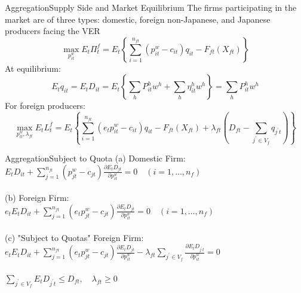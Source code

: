 \documentclass{beamer}
\begin{document}
\begin{frame}{Aggregation}{Supply Side and Market Equilibrium}
The firms participating in the market are of three types: domestic, foreign non-Japanese, and Japanese producers facing the VER
$$\max _{p_{i t}^{w}} E_{t} \Pi_{t}^{f}=E_{t}\left\{\sum_{i=1}^{n_{f t}}\left(p_{i t}^{w}-c_{i t}\right) q_{i t}-F_{f t}\left(X_{f t}\right)\right\}$$
At equilibrium:
$$E_{t} q_{i t}=E_{t} D_{i t}=E_{t}\left\{\sum_{h} P_{i t}^{h} w^{h}+\sum_{h} \eta_{i t}^{h} w^{h}\right\}=\sum_{h} P_{i t}^{h} w^{h}$$
For foreign producers:
$$\max _{p_{t t}^{w}, \lambda_{f t}} E_{t} L_{t}^{f}=E_{t}\left\{\sum_{i=1}^{n_{f t}}\left(e_{t} p_{i t}^{w}-c_{i t}\right) q_{i t}-F_{f t}\left(X_{f t}\right)+\lambda_{f t}\left(D_{f t}-\sum_{j^{\prime} \in V_{f}} q_{j^{\prime} t}\right)\right\}$$
\end{frame}
\begin{frame}{Aggregation}{Subject to Quota}
	(a) Domestic Firm: \\
	$E_{t} D_{i t}+\sum_{j=1}^{n_{f t}}\left(p_{j t}^{w}-c_{j t}\right) \frac{\partial E_{t} D_{j t}}{\partial p_{i t}^{w}}=0 \quad\left(i=1, \ldots, n_{f}\right)$ \\~\\
	(b) Foreign Firm: \\
	$e_{t} E_{t} D_{i t}+\sum_{j=1}^{n_{f t}}\left(e_{t} p_{j t}^{w}-c_{j t}\right) \frac{\partial E_{t} D_{j t}}{\partial p_{i t}^{w}}=0 \quad\left(i=1, \ldots, n_{f}\right)$ \\~\\
	(c) "Subject to Quotas" Foreign Firm: \\
	$e_{t} E_{t} D_{i t}+\sum_{j=1}^{n_{f t}}\left(e_{t} p_{j t}^{w}-c_{j t}\right) \frac{\partial E_{t} D_{j t}}{\partial p_{i t}^{w}}-\lambda_{f t} \sum_{j^{\prime} \in V_{f}} \frac{\partial E_{t} D_{j^{\prime} t}}{\partial p_{i t}^{w}}=0$ \\~\\
	$\sum_{j^{\prime} \in V_{f}} E_{t} D_{j^{\prime} t} \leqslant D_{f t}, \quad \lambda_{f t} \geqslant 0$
\end{frame}
\end{document}
